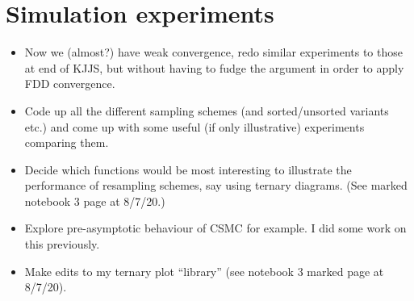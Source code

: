 \documentclass{article}
\begin{document}
\section*{Simulation experiments}
\begin{itemize}
\item Now we (almost?) have weak convergence, redo similar experiments to those at end of KJJS, but without having to fudge the argument in order to apply FDD convergence.
\item Code up all the different sampling schemes (and sorted/unsorted variants etc.) and come up with some useful (if only illustrative) experiments comparing them.
\item Decide which functions would be most interesting to illustrate the performance of resampling schemes, say using ternary diagrams. (See marked notebook 3 page at 8/7/20.)
\item Explore pre-asymptotic behaviour of CSMC for example. I did some work on this previously.
\item Make edits to my ternary plot ``library'' (see notebook 3 marked page at 8/7/20).
\end{itemize}
\end{document}

